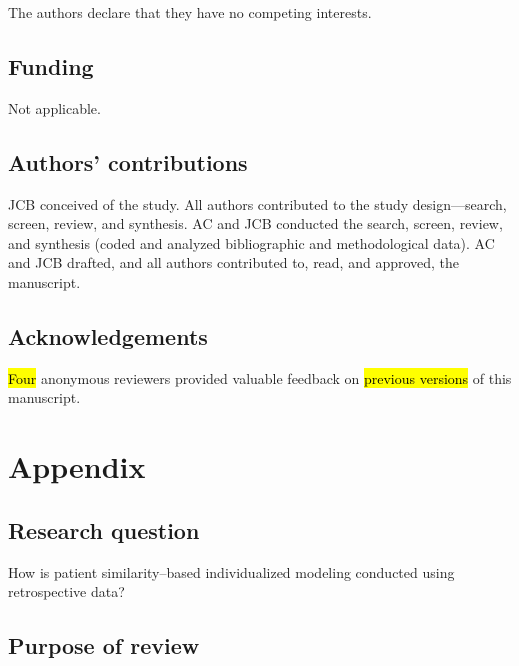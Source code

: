 \documentclass[sn-mathphys,Numbered,pdflatex]{sn-jnl}
\theoremstyle{remark}
\theoremstyle{definition}
\begin{document}
The authors declare that they have no competing interests.

\subsection*{Funding}\label{funding}

Not applicable.

\subsection*{Authors' contributions}\label{authors-contributions}

JCB conceived of the study. All authors contributed to the study
design---search, screen, review, and synthesis. AC and JCB conducted the
search, screen, review, and synthesis (coded and analyzed bibliographic
and methodological data). AC and JCB drafted, and all authors
contributed to, read, and approved, the manuscript.

\subsection*{Acknowledgements}\label{acknowledgements}

\hl{Four} anonymous reviewers provided valuable feedback on
\hl{previous versions} of this manuscript.

\pagebreak

\section*{Appendix}\label{appendix}

\subsection*{Research question}\label{research-question}

How is patient similarity--based individualized modeling conducted using
retrospective data?

\subsection*{Purpose of review}\label{purpose-of-review}
\end{document}

